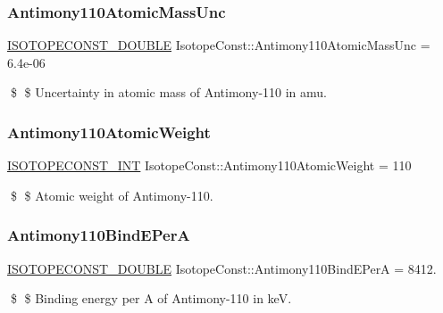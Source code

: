\subsubsection{\texorpdfstring{Antimony110\+Atomic\+Mass\+Unc}{Antimony110AtomicMassUnc}}
{\footnotesize\ttfamily \mbox{\hyperlink{group___isotope_const-_macros_ga8f45a7272ce02c0b4c65c44636ed719a}{I\+S\+O\+T\+O\+P\+E\+C\+O\+N\+S\+T\+\_\+\+D\+O\+U\+B\+LE}} Isotope\+Const\+::\+Antimony110\+Atomic\+Mass\+Unc = 6.\+4e-\/06}

\$ \$ Uncertainty in atomic mass of Antimony-\/110 in amu. \mbox{\label{group___isotope_const-_antimony-_sb110_gadd1f49eff1ec4e7823e9add6cf24140e}} 
\subsubsection{\texorpdfstring{Antimony110\+Atomic\+Weight}{Antimony110AtomicWeight}}
{\footnotesize\ttfamily \mbox{\hyperlink{group___isotope_const-_macros_ga5f18360b3e99483a35c32d789e62621c}{I\+S\+O\+T\+O\+P\+E\+C\+O\+N\+S\+T\+\_\+\+I\+NT}} Isotope\+Const\+::\+Antimony110\+Atomic\+Weight = 110}

\$ \$ Atomic weight of Antimony-\/110. \mbox{\label{group___isotope_const-_antimony-_sb110_ga42b353aeb78a99c641ff2d48607fce42}} 
\subsubsection{\texorpdfstring{Antimony110\+Bind\+E\+PerA}{Antimony110BindEPerA}}
{\footnotesize\ttfamily \mbox{\hyperlink{group___isotope_const-_macros_ga8f45a7272ce02c0b4c65c44636ed719a}{I\+S\+O\+T\+O\+P\+E\+C\+O\+N\+S\+T\+\_\+\+D\+O\+U\+B\+LE}} Isotope\+Const\+::\+Antimony110\+Bind\+E\+PerA = 8412.}

\$ \$ Binding energy per A of Antimony-\/110 in keV. \mbox{\label{group___isotope_const-_antimony-_sb110_gac3e73a19ee68ff3e4c3b61027bfa3ac4}} 
